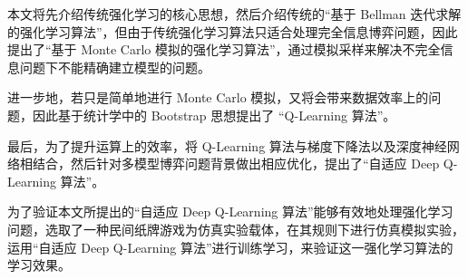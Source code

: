 本文将先介绍传统强化学习的核心思想，然后介绍传统的“基于 Bellman 迭代求解的强化学习算法”，但由于传统强化学习算法只适合处理完全信息博弈问题，因此提出了“基于 Monte Carlo 模拟的强化学习算法”，通过模拟采样来解决不完全信息问题下不能精确建立模型的问题。

进一步地，若只是简单地进行 Monte Carlo 模拟，又将会带来数据效率上的问题，因此基于统计学中的 Bootstrap 思想\cite{efron1994introduction}\cite{2014wzjstatistics}提出了 “Q-Learning 算法”。

最后，为了提升运算上的效率，将 Q-Learning 算法与梯度下降法以及深度神经网络相结合\cite{mnih2013playing}，然后针对多模型博弈问题背景做出相应优化，提出了“自适应 Deep Q-Learning 算法”。

为了验证本文所提出的“自适应 Deep Q-Learning 算法”能够有效地处理强化学习问题，选取了一种民间纸牌游戏为仿真实验载体，在其规则下进行仿真模拟实验，运用“自适应 Deep Q-Learning 算法”进行训练学习，来验证这一强化学习算法的学习效果。